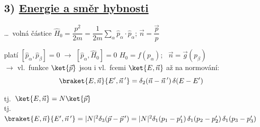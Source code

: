 \subsection*{3) \underline{Energie a směr hybnosti} \ }
\dots\ volná částice \quad $\hat H_0 = \dfrac{p^2}{2m} = \dfrac{1}{2m}\sum_\alpha\hat p_\alpha\cdot\hat p_\alpha$; \quad $\vec n = \dfrac{\vec p}{p}$

platí \quad $[\hat p_\alpha,\hat p_\beta] = 0$ \quad $\to$ \quad $[\hat p_\alpha,\hat H_0] = 0$ \qquad $H_0 = f(p_\alpha)$; \ $\vec n = \vec g(p_\beta)$ \\
$\to$ vl.\ funkce $\ket{\vec p}$ jsou i vl.\ fcemi $\ket{E,\vec n}$ až na normování:
\[
  \braket{E,\vec n}{E',\vec n\,'} = \delta_2(\vec n - \vec n\,')\,\delta(E - E')
\]
\hspace*{3.5cm} \quad {}

tj.\ \quad $\ket{E,\vec n} = N\ket{\vec p}$ \\
tj.\ \quad $\braket{E,\vec n}{E',\vec n\,'} = |N|^2\delta_3(\vec p - \vec p\,') = |N|^2\delta_1(p_1 - p_1')\,\delta_1(p_2 - p_2')\,\delta_1(p_3 - p_3')$ \\
\hspace*{4.5cm}

